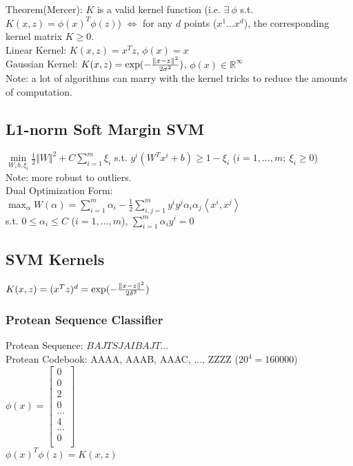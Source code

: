 \documentclass{article}
\begin{document}
\noindent
Theorem(Mercer): $K$ is a valid kernel function (i.e. $\exists\ \phi$ s.t. $K(x,z)={\phi(x)}^T\phi(z)$) $\iff$ for any $d$ points ($x^1 ... x^d$), the corresponding kernel matrix $K \geq 0$.\\

\noindent
Linear Kernel: $K(x,z) = x^Tz$, $\phi(x) = x$\\
Gaussian Kernel: $K(x,z) = {\rm exp} (-\frac{{\Vert x-z \Vert}^2}{{2\sigma}^2})$, $\phi(x) \in \mathbb{R}^\infty$\\

\noindent
Note: a lot of algorithms can marry with the kernel tricks to reduce the amounts of computation.

\subsection{L1-norm Soft Margin SVM}
$\min\limits_{W,b,\xi_i} \frac{1}{2}{\Vert W \Vert}^2+ C\sum\limits_{i=1}^m\xi_i$ s.t. $y^i(W^Tx^i+b) \geq 1-\xi_i$ ($i=1,...,m;\ \xi_i \geq 0$)\\
Note: more robust to outliers.\\

\noindent
Dual Optimization Form: \\
$\max_\alpha W(\alpha) = \sum\limits_{i=1}^m\alpha_i - \frac{1}{2}\sum\limits_{i,j=1}^my^iy^j\alpha_i\alpha_j\left< x^i,x^j \right>$\\
s.t. $0 \leq \alpha_i \leq C$ ($i = 1, ..., m$), $\sum\limits_{i=1}^m\alpha_iy^i=0$

\subsection{SVM Kernels}
$K(x,z) = (x^Tz)^d = {\rm exp}(-\frac{{\Vert x-z \Vert}^2}{2\delta^2})$
\subsubsection{Protean Sequence Classifier}
Protean Sequence: $BAJTSJAIBAJT...$\\
Protean Codebook: AAAA, AAAB, AAAC, ..., ZZZZ ($20^4=160000$)\\
$\phi(x)=\begin{bmatrix}
  0\\
  0\\
  2\\
  0\\
  ...\\
  4\\
  ...\\
  0\\
  \end{bmatrix}$\\
$\phi(x)^T\phi(z)=K(x,z)$
\end{document}

